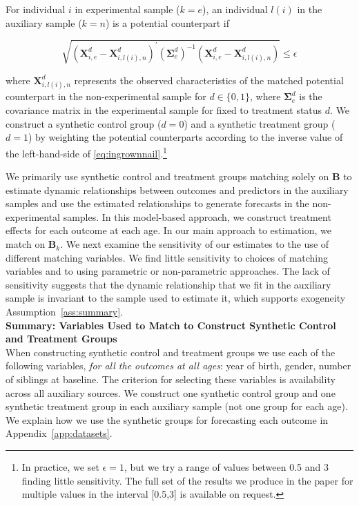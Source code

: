 \onehalfspacing
\begin{algorithm} \label{alg:match}
For individual $i$ in experimental sample ($k=e$), an individual $l(i)$ in the auxiliary sample ($k=n$) is a potential counterpart if

\begin{equation}\label{eq:ingrownnail}
\sqrt{(\bm{X}^d_{i,e} - \bm{X}^d_{i,l(i),n})^\prime (\bm{\Sigma}^d_e)^{-1} (\bm{X}^d_{i,e} - \bm{X}^d_{i,l(i),n})} \leq \epsilon
\end{equation}

\noindent where $\bm{X}^d_{i,l(i),n}$ represents the observed characteristics of the matched potential counterpart in the non-experimental sample for $d \in \{0,1\}$, where $\bm{\Sigma}^d_e$ is the covariance matrix in the experimental sample for fixed to treatment status $d$. We construct a synthetic control group ($d = 0$) and a synthetic treatment group ($d = 1$) by weighting the potential counterparts according to the inverse value of the left-hand-side of \eqref{eq:ingrownnail}.\footnote{In practice, we set $\epsilon = 1$, but we try a range of values between 0.5 and 3 finding little sensitivity. The full set of the results we produce in the paper for multiple values in the interval [0.5,3] is available on request.}
\end{algorithm}
\doublespacing

\noindent We primarily use synthetic control and treatment groups matching solely on $\bm{B}$ to estimate dynamic relationships between outcomes and predictors in the auxiliary samples and use the estimated relationships to generate forecasts in the non-experimental samples. In this model-based approach, we construct treatment effects for each outcome at each age. In our main approach to estimation, we match on $\bm{B}_k$. We next examine the sensitivity of our estimates to the use of different matching variables. We find little sensitivity to choices of matching variables and to using parametric or non-parametric approaches. The lack of sensitivity suggests that the dynamic relationship that we fit in the auxiliary sample is invariant to the sample used to estimate it, which supports exogeneity Assumption~\ref{ass:summary}.\\


\noindent \textbf{Summary: Variables Used to Match to Construct Synthetic Control and Treatment Groups}\\
When constructing synthetic control and treatment groups we use each of the following variables, \textit{for all the outcomes at all ages}: year of birth, gender, number of siblings at baseline. The criterion for selecting these variables is availability across all auxiliary sources. We construct one synthetic control group and one synthetic treatment group in each auxiliary sample (not one group for each age). We explain how we use the synthetic groups for forecasting each outcome in Appendix~\ref{app:datasets}. \\


